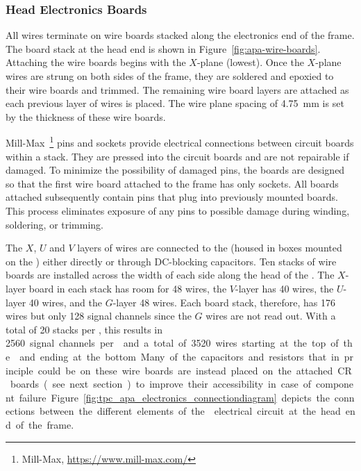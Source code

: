 \subsubsection{Head Electronics Boards}

All  wires terminate on wire boards stacked along the electronics end of the  frame.  The board stack at the head end is shown in Figure~\ref{fig:apa-wire-boards}. Attaching the wire boards begins with the $X$-plane (lowest). Once the $X$-plane wires are strung on both sides of the  frame, they are soldered and epoxied to their wire boards and trimmed. The remaining wire board layers are attached as each previous layer of wires is placed.  The wire plane spacing of \SI{4.75}{mm} is set by the thickness of these wire boards.   

Mill-Max~\footnote{Mill-Max\texttrademark{}, \url{https://www.mill-max.com/}} pins and sockets provide electrical connections between circuit boards within a stack. They are pressed into the circuit boards and are not repairable if damaged. To minimize the possibility of damaged pins, the boards are designed so that the first wire board attached to the frame has only sockets. All boards attached subsequently contain pins that plug into previously mounted boards. This process eliminates exposure of any pins to possible damage during winding, soldering, or trimming.

The $X$, $U$ and $V$ layers of wires are connected to the  (housed in boxes mounted on the ) either directly or through DC-blocking capacitors.  Ten stacks of wire boards are installed across the width of each side along the head of the .  The $X$-layer board in each stack has room for \num{48} wires, the $V$-layer has 40 wires, the $U$-layer \num{40} wires, and the $G$-layer \num{48} wires.  Each board stack, therefore, has 176 wires but only \num{128} signal channels since the $G$ wires are not read out. With a total of \num{20} stacks per , this results in \SI{2560} signal channels per  and a total of \SI{3520} wires starting at the top of the  and ending at the bottom. Many of the capacitors and resistors that in principle could be on these wire boards are instead placed on the attached CR boards (see next section) to improve their accessibility in case of component failure. Figure~\ref{fig:tpc_apa_electronics_connectiondiagram} depicts the connections between the different elements of the  electrical circuit at the head end of the frame. 

